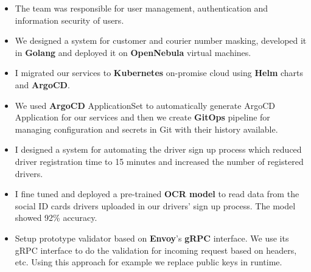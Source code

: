 \begin{itemize}
  \item The team was responsible for user management, authentication and information security of users.
  \item We designed a system for customer and courier number masking, developed it in \textbf{Golang} and deployed it on \textbf{OpenNebula} virtual machines.
  \item I migrated our services to \textbf{Kubernetes} on-promise cloud using \textbf{Helm} charts and \textbf{ArgoCD}.
  \item We used \textbf{ArgoCD} ApplicationSet to automatically generate ArgoCD Application for our services and then we create \textbf{GitOps} pipeline for managing configuration and secrets in Git with their history available.
  \item I designed a system for automating the driver sign up process which reduced driver registration time to 15 minutes and increased the number of registered drivers.
  \item I fine tuned and deployed a pre-trained \textbf{OCR model} to read data from the social ID cards drivers uploaded in our drivers' sign up process. The model showed 92\% accuracy.
  \item Setup prototype validator based on \textbf{Envoy}'s \textbf{gRPC} interface. We use its gRPC interface to do the validation for incoming request
        based on headers, etc. Using this approach for example we replace public keys in runtime.
\end{itemize}

\vspace{0.5cm}

